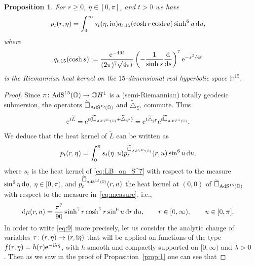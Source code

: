\documentclass[10pt,a4paper]{amsart}
\numberwithin{equation}{section}
\newtheorem{Proposition}[Theorem]{Proposition}
 { \theoremstyle{definition}
\newtheorem{Example}[Theorem]{Example}
\newtheorem{Remark}[Theorem]{Remark} }
\begin{document}
\begin{Proposition}\label{prop:2}
For $r\geq 0$, $\eta\in [0,\pi]$, and $t >0$ we have
\begin{equation*}%
p_t(r,\eta)=\int_{0}^{\infty} s_t(\eta , {\rm i}u) q_{t,15}(\cosh r \cosh u) \sinh^6u \, {\rm d}u,
\end{equation*}
where
\begin{equation}\label{eq:riem.heat.kernel.on.H^15}
q_{t,15}(\cosh s):=\frac{{\rm e}^{-49t}}{(2\pi)^{7}\sqrt{4\pi t}}\left(-\frac{1}{\sinh s}\frac{{\rm d}}{{\rm d}s}\right)^{7}{\rm e}^{-s^2/4t}
\end{equation}
is the Riemannian heat kernel on the $15$-dimensional real hyperbolic space ${\mathbb{H}}^{15}$.
\end{Proposition}

\begin{proof}
Since $\pi\colon {\rm AdS}^{15}(\mathbb{O}) \to \mathbb{O}H^1$
is a (semi-Riemannian) totally geodesic submersion, the operators $\widetilde{{\square}}_{{\rm AdS}^{15}(\mathbb{O})}$ and $\widetilde{\triangle}_{\mathbb{S}^7}$ commute. Thus
\begin{equation*}
{\rm e}^{t\widetilde{L}}={\rm e}^{t(\widetilde{\square}_{{\rm AdS}^{15}(\mathbb{O})}+\widetilde{\triangle}_{\mathbb{S}^7})}={\rm e}^{t\widetilde{\triangle}_{\mathbb{S}^7}}{\rm e}^{t\widetilde{\square}_{{\rm AdS}^{15}(\mathbb{O})}}.
\end{equation*}
We deduce that the heat kernel of $\tilde{L}$ can be written as
\begin{equation}\label{eq:9}
p_t(r,\eta)=\int_{0}^{\pi}s_t(\eta,u)p^{\widetilde{\square}_{{\rm AdS}^{15}(\mathbb{O})}}_t(r,u)\sin^6u\,{\rm d}u,
\end{equation}
where $s_t$ is the heat kernel of \eqref{eq:LB_on_S^7} with respect to the measure $\sin^6\eta \, {\rm d}\eta$, $\eta\in [0,\pi)$, and $p^{\widetilde{\square}_{{\rm AdS}^{15}(\mathbb{O})}}_t(r,u)$ the heat kernel at $(0,0)$ of $\widetilde{\square}_{{\rm AdS}^{15}(\mathbb{O})}$ with respect to the measure in~\eqref{eq:measure}, i.e.,
\begin{equation*}
{\rm d}\mu(r,u)=\frac{{\pi}^7}{90}\sinh^7 r\cosh^7 r\sin^6 u \,{\rm d}r\, {\rm d}u, \qquad r\in [0,\infty),\qquad u\in[0,\pi].
\end{equation*}
In order to write \eqref{eq:9} more precisely, let us consider the analytic change of variables $\tau\colon (r,\eta) \rightarrow (r,{\rm i}\eta)$ that will be applied on functions of the type $f(r,\eta)=h(r){\rm e}^{-{\rm i}\lambda \eta}$, with $h$ smooth and compactly supported on $[0,\infty)$ and $\lambda>0$. Then as we saw in the proof of Proposition~\ref{prop:1} one can see that

\end{proof}
\end{document}
